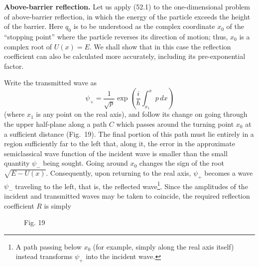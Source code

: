 \textbf{Above-barrier reflection.} Let us apply (52.1) to the one-dimensional
problem of above-barrier reflection, in which the energy of the particle
exceeds the height of the barrier. Here $q_0$ is to be understood as the
complex coordinate $x_0$ of the ``stopping point'' where the particle reverses
its direction of motion; thus, $x_0$ is a complex root of $U(x)=E$. We shall
show that in this case the reflection coefficient can also be calculated more
accurately, including its pre-exponential factor.




Write the transmitted wave as
\[
 \psi_+=\frac1{\sqrt p}\exp\left(\frac i\hbar\int_{x_1}^x p\,dx\right)
\]
(where $x_1$ is any point on the real axis), and follow its change on going
through the upper half-plane along a path $C$ which passes around the turning
point $x_0$ at a sufficient distance (Fig.~19). The final portion of this path
must lie entirely in a region sufficiently far to the left that, along it, the
error in the approximate semiclassical wave function of the incident wave is
smaller than the small quantity $\psi_-$ being sought. Going around $x_0$
changes the sign of the root $\sqrt{E-U(x)}$. Consequently, upon returning to
the real axis, $\psi_+$ becomes a wave $\psi_-$ traveling to the left, that is,
the reflected wave\footnote{A path passing below $x_0$ (for example, simply
along the real axis itself) instead transforms $\psi_+$ into the incident
wave.}. Since the amplitudes of the incident and transmitted waves may be
taken to coincide, the required reflection coefficient $R$ is simply

\begin{figure}[ht]
\centering
{}
\par\smallskip Fig. 19
\end{figure}

